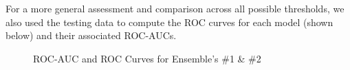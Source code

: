 \documentclass [MAS] {uclathes}
\begin{document}
For a more general assessment and comparison across all possible thresholds, we also used the testing data to compute the ROC curves for each model (shown below) and their associated ROC-AUCs.

\begin{figure}[hbt!]
\hspace*{\fill}
\footnotesize 
\centering
\vspace{0cm}
\hspace{1em}
\hspace*{\fill}
\label{fig:roc}
\caption{ROC-AUC and ROC Curves for Ensemble's \#1 \& \#2}
\end{figure}
\end{document}
